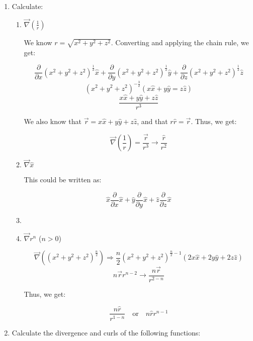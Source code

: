 \begin{enumerate}
    
  \item Calculate:

    \begin{enumerate}

      \item $\vec{\nabla}\left( \frac{1}{r} \right)$

        We know $r=\sqrt{x^2+y^2+z^2}$. Converting and applying the chain rule, we get:

        $$\frac{\partial}{\partial x}\left( x^2+y^2+z^2\right)^{\frac{1}{2}}\hat{x}+\frac{\partial}{\partial y}\left( x^2+y^2+z^2\right)^{\frac{1}{2}}\hat{y}+\frac{\partial}{\partial z}\left( x^2+y^2+z^2\right)^{\frac{1}{2}}\hat{z}$$
        $$(x^2+y^2+z^2)^{-\frac{3}{2}}(x\hat{x}+y\hat{y}=z\hat{z})$$
        $$\frac{x\hat{x}+y\hat{y}+z\hat{z}}{r^3}$$

        We also know that $\vec{r}=x\hat{x}+y\hat{y}+z\hat{z}$, and that $r\hat{r}=\vec{r}$. Thus, we get:

        $$\boxed{\vec{\nabla}\left( \frac{1}{r} \right)=\frac{\vec{r}}{r^3}\rightarrow\frac{\hat{r}}{r^2}}$$

      \item $\vec{\nabla}\hat{x}$


        This could be written as:

          $$\hat{x}\frac{\partial}{\partial x}\hat{x}+\hat{y}\frac{\partial}{\partial y}\hat{x}+\hat{z}\frac{\partial}{\partial z}\hat{x}$$

      \item 

      \item $\vec{\nabla}r^n$ ($n>0$)

        $$\vec{\nabla}((x^2+y^2+z^2)^\frac{n}{2})\Rightarrow \frac{n}{2}(x^2+y^2+z^2)^{\frac{n}{2}-1}\left( 2x\hat{x}+2y\hat{y}+2z\hat{z} \right)$$
        $$n\vec{r}r^{n-2}\rightarrow \frac{n\vec{r}}{r^{2-n}}$$

        Thus, we get:

        $$\boxed{\frac{n\hat{r}}{r^{1-n}}\quad\text{or}\quad n\hat{r}r^{n-1}}$$

    \end{enumerate}

  \item Calculate the divergence and curls of the following functions:

    \begin{enumerate}


\end{enumerate}
\end{enumerate}
